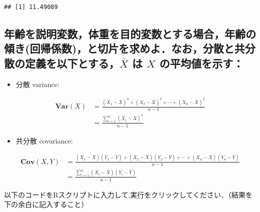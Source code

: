 \documentclass[11pt,]{problemset}
\newenvironment{Shaded}{\begin{snugshade}}{\end{snugshade}}
\newcommand{\CommentTok}[1]{\textcolor[rgb]{0.56,0.35,0.01}{\textit{#1}}}
\newcommand{\KeywordTok}[1]{\textcolor[rgb]{0.13,0.29,0.53}{\textbf{#1}}}
\newcommand{\NormalTok}[1]{#1}
\newcommand{\OperatorTok}[1]{\textcolor[rgb]{0.81,0.36,0.00}{\textbf{#1}}}
\newcommand{\StringTok}[1]{\textcolor[rgb]{0.31,0.60,0.02}{#1}}
\providecommand{\tightlist}{%
  \setlength{\itemsep}{0pt}\setlength{\parskip}{0pt}}
\begin{document}
\begin{verbatim}
## [1] 11.49089
\end{verbatim}

\hypertarget{barx--x-}{%
\subsection{\texorpdfstring{年齢を説明変数，体重を目的変数とする場合，年齢の傾き(回帰係数)，と切片を求めよ．なお，分散と共分散の定義を以下とする，\(\bar{X}\)
は \(X\)
の平均値を示す：}{年齢を説明変数，体重を目的変数とする場合，年齢の傾き(回帰係数)，と切片を求めよ．なお，分散と共分散の定義を以下とする，\textbackslash{}bar\{X\} は X の平均値を示す：}}\label{barx--x-}}

\begin{itemize}
\tightlist
\item
  分散 variance:
\end{itemize}

\[
\begin{aligned}
\mathbf{Var}(X) & = \frac{(X_1-\bar{X})^2+(X_2-\bar{X})^2+\cdots+(X_n-\bar{X})^2}{n - 1} \\
                & = \frac{\sum_{i=1}^n(X_i-\bar{X})^2}{n -1}
\end{aligned}
\]

\begin{itemize}
\tightlist
\item
  共分散 covariance:
\end{itemize}

\[
\begin{aligned}
\mathbf{Cov}(X, Y) & = \frac{(X_1 - \bar{X})(Y_1-\bar{Y}) + (X_2 - \bar{X})(Y_2-\bar{Y}) + \cdots + (X_n - \bar{X})(Y_n-\bar{Y})}{n - 1} \\
                   & = \frac{\sum_{i = 1}^n(X_i - \bar{X})(Y_i-\bar{Y})}{n - 1}
\end{aligned}
\]

以下のコードをRスクリプトに入力して,実行をクリックしてください．（結果を下の余白に記入すること）

\begin{Shaded}
\end{Shaded}
\end{document}
